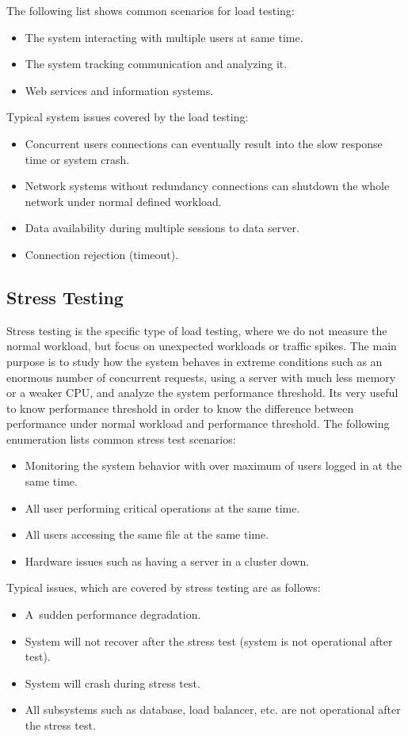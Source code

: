 The following list shows common scenarios for load testing:
\begin{itemize}
	\setlength\itemsep{0em}
	\item The system interacting with multiple users at same time.
	\item The system tracking communication and analyzing it.
	\item Web services and information systems.
\end{itemize}
Typical system issues covered by the load testing:
\begin{itemize}
	\setlength\itemsep{0em}
	\item Concurrent users connections can eventually result into the slow response time or system crash.
	\item Network systems without redundancy connections can shutdown the whole network under normal defined workload.
	\item Data availability during multiple sessions to data server.
	\item Connection rejection (timeout).
\end{itemize}

\subsection*{Stress Testing}
\label{Stress Testing}
Stress testing is the specific type of load testing, where we do not measure the normal workload, but focus on unexpected workloads or traffic spikes. The main purpose is to study how the system behaves in extreme conditions such as an enormous number of concurrent requests, using a server with much less memory or a weaker CPU, and analyze the system performance threshold. Its very useful to know performance threshold in order to know the difference between performance under normal workload and performance threshold. The following enumeration lists common stress test scenarios:
\begin{itemize}
	\setlength\itemsep{0em}
	\item Monitoring the system behavior with over maximum of users logged in at the same time.
	\item All user performing critical operations at the same time.
	\item All users accessing the same file at the same time.
	\item Hardware issues such as having a server in a cluster down.
\end{itemize}
Typical issues, which are covered by stress testing are as follows:
\begin{itemize}
	\setlength\itemsep{0em}
	\item A~sudden performance degradation.
	\item System will not recover after the stress test (system is not operational after test).
	\item System will crash during stress test.
	\item All subsystems such as database, load balancer, etc. are not operational after the stress test.
\end{itemize}


